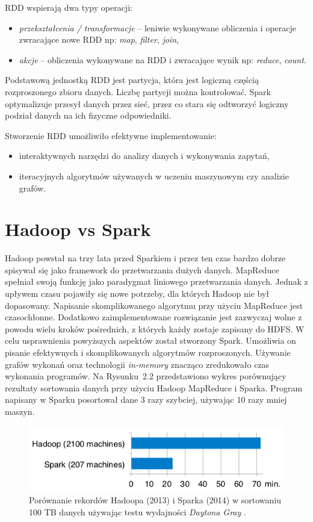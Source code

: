 \documentclass[magisterska]{pracamgr}
\begin{document}
RDD wspierają dwa typy operacji:
\begin{itemize}
    \item \textit{przekształcenia / transformacje} -- leniwie wykonywane obliczenia i operacje zwracające nowe RDD np: \textit{map}, \textit{filter}, \textit{join},
    \item \textit{akcje} -- obliczenia wykonywane na RDD i zwracające wynik np: \textit{reduce}, \textit{count}.
\end{itemize}

Podstawową jednostką RDD jest partycja, która jest logiczną częścią rozproszonego zbioru danych. Liczbę partycji można kontrolować. Spark optymalizuje przesył danych przez sieć, przez co stara się odtworzyć logiczny podział danych na ich fizyczne odpowiedniki.

Stworzenie RDD umożliwiło efektywne implementowanie:
\begin{itemize}
    \item interaktywnych narzędzi do analizy danych i wykonywania zapytań,
    \item iteracyjnych algorytmów używanych w uczeniu maszynowym czy analizie grafów.
\end{itemize}

\section{Hadoop vs Spark}

Hadoop powstał na trzy lata przed Sparkiem i przez ten czas bardzo dobrze spisywał się jako framework do przetwarzania dużych danych. MapReduce spełniał swoją funkcję jako paradygmat liniowego przetwarzania danych. Jednak z upływem czasu pojawiły się nowe potrzeby, dla których Hadoop nie był dopasowany. Napisanie skomplikowanego algorytmu przy użyciu MapReduce jest czasochłonne. Dodatkowo zaimplementowane rozwiązanie jest zazwyczaj wolne z powodu wielu kroków pośrednich, z których każdy zostaje zapisany do HDFS. W celu usprawnienia powyższych aspektów został stworzony Spark. Umożliwia on pisanie efektywnych i skomplikowanych algorytmów rozproszonych. Używanie grafów wykonań oraz technologii \textit{in-memory} znacząco zredukowało czas wykonania programów. Na \mbox{Rysunku 2.2} przedstawiono wykres porównujący rezultaty sortowania danych przy użyciu Hadoop MapReduce i Sparka. Program napisany w Sparku posortował dane 3 razy szybciej, używając 10 razy mniej maszyn.


\begin{figure}[H]
    \caption{Porównanie rekordów Hadoopa (2013) i Sparka (2014) w sortowaniu 100 TB danych używając testu wydajności \textit{Daytona Gray} \cite{Armbrust:2015:SSR:2824032.2824080}.}
    \includegraphics[width=15cm]{hadoop_vs_spark.png}
\end{figure}
\end{document}
